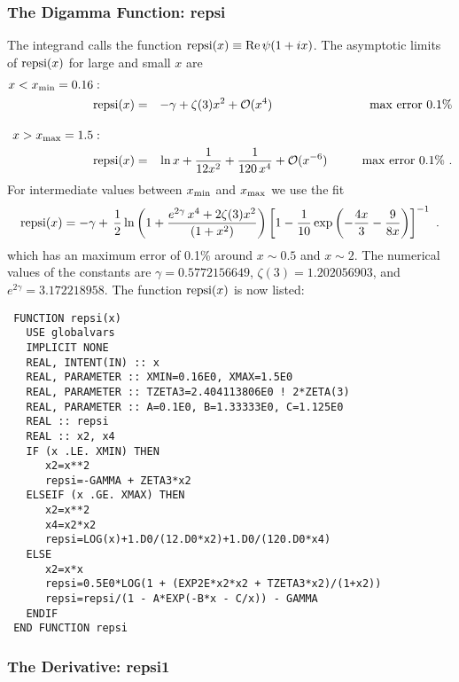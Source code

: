 \documentclass[preprint,12pt,eqsecnum,nofootinbib,amsmath,amssymb]{revtex4}
\begin{document}
\pagebreak
\subsubsection{The Digamma Function: repsi}

The integrand calls the function ${\rm repsi}(x) \equiv 
{\rm Re}\,\psi(1 + i x)$. The asymptotic limits of 
${\rm repsi}(x)$ for large and small $x$ are
\begin{eqnarray}
\nonumber
  x < x_{\rm min}=0.16: \hskip1cm \\  
\label{repsixmin}
  {\rm repsi}(x) &=& -\gamma + \zeta(3)x^2 + {\cal O}(x^4) 
  \hskip2.8cm {\rm max~error~} 0.1\% 
\\[10pt]
\nonumber
  x > x_{\rm max}=1.5: \hskip1cm \\  
\label{repsixmax}
  {\rm repsi}(x) &=& \ln x +\frac{1}{12 x^2} +
  \frac{1}{120\, x^4} + {\cal O}(x^{-6}) 
  \hskip1cm {\rm max~error~}0.1\% \ .
\end{eqnarray}
For intermediate values between $x_{\rm min}$ and 
$x_{\rm max}$ we use the fit
\begin{eqnarray}
  {\rm repsi}(x) = -\gamma + \,
  \frac{1}{2}\ln\left(1 + \frac{e^{2\gamma}\,x^4 +
  2 \zeta(3) x^2 }{(1+x^2)} \right)
  \left[1 - \frac{1}{10}\exp\left(- \frac{4x}{3} - 
  \frac{9}{8 x} \right)\right]^{-1} \ .
\end{eqnarray}
which has an maximum error of 0.1\% around $x \sim 0.5$ 
and $x \sim 2$. The numerical values of the constants
are $\gamma=0.5772156649$, $\zeta(3)=1.202056903$, and 
$e^{2\gamma}=3.172218958$. The function ${\rm repsi}(x)$
is now listed:

{
\baselineskip12pt
\begin{verbatim}
 FUNCTION repsi(x)  
   USE globalvars
   IMPLICIT NONE
   REAL, INTENT(IN) :: x
   REAL, PARAMETER :: XMIN=0.16E0, XMAX=1.5E0
   REAL, PARAMETER :: TZETA3=2.404113806E0 ! 2*ZETA(3)
   REAL, PARAMETER :: A=0.1E0, B=1.33333E0, C=1.125E0
   REAL :: repsi
   REAL :: x2, x4
   IF (x .LE. XMIN) THEN
      x2=x**2
      repsi=-GAMMA + ZETA3*x2
   ELSEIF (x .GE. XMAX) THEN
      x2=x**2
      x4=x2*x2
      repsi=LOG(x)+1.D0/(12.D0*x2)+1.D0/(120.D0*x4)
   ELSE
      x2=x*x
      repsi=0.5E0*LOG(1 + (EXP2E*x2*x2 + TZETA3*x2)/(1+x2))
      repsi=repsi/(1 - A*EXP(-B*x - C/x)) - GAMMA
   ENDIF
 END FUNCTION repsi
\end{verbatim}
}
\vskip1cm

\subsubsection{The Derivative: repsi1}
\end{document}
